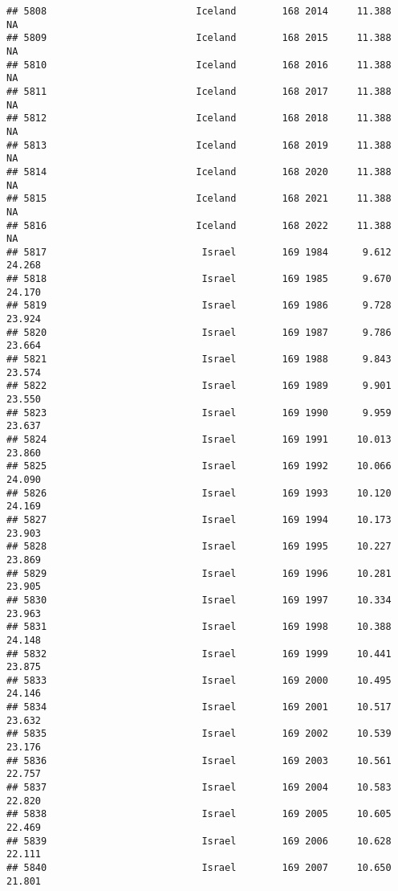 \documentclass[
]{article}
\begin{document}
\begin{verbatim}
## 5808                          Iceland        168 2014     11.388         NA
## 5809                          Iceland        168 2015     11.388         NA
## 5810                          Iceland        168 2016     11.388         NA
## 5811                          Iceland        168 2017     11.388         NA
## 5812                          Iceland        168 2018     11.388         NA
## 5813                          Iceland        168 2019     11.388         NA
## 5814                          Iceland        168 2020     11.388         NA
## 5815                          Iceland        168 2021     11.388         NA
## 5816                          Iceland        168 2022     11.388         NA
## 5817                           Israel        169 1984      9.612     24.268
## 5818                           Israel        169 1985      9.670     24.170
## 5819                           Israel        169 1986      9.728     23.924
## 5820                           Israel        169 1987      9.786     23.664
## 5821                           Israel        169 1988      9.843     23.574
## 5822                           Israel        169 1989      9.901     23.550
## 5823                           Israel        169 1990      9.959     23.637
## 5824                           Israel        169 1991     10.013     23.860
## 5825                           Israel        169 1992     10.066     24.090
## 5826                           Israel        169 1993     10.120     24.169
## 5827                           Israel        169 1994     10.173     23.903
## 5828                           Israel        169 1995     10.227     23.869
## 5829                           Israel        169 1996     10.281     23.905
## 5830                           Israel        169 1997     10.334     23.963
## 5831                           Israel        169 1998     10.388     24.148
## 5832                           Israel        169 1999     10.441     23.875
## 5833                           Israel        169 2000     10.495     24.146
## 5834                           Israel        169 2001     10.517     23.632
## 5835                           Israel        169 2002     10.539     23.176
## 5836                           Israel        169 2003     10.561     22.757
## 5837                           Israel        169 2004     10.583     22.820
## 5838                           Israel        169 2005     10.605     22.469
## 5839                           Israel        169 2006     10.628     22.111
## 5840                           Israel        169 2007     10.650     21.801

\end{verbatim}
\end{document}
